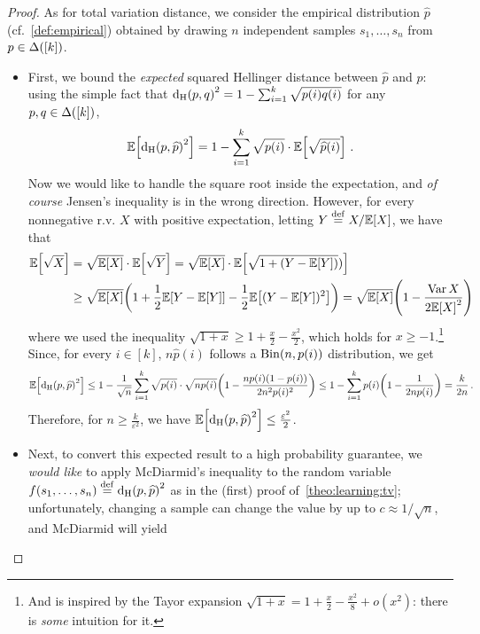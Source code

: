 \documentclass[10pt]{article}
\newcommand{\dst}{\varepsilon}
\newcommand{\ab}{k}
\newcommand{\ns}{n}
\begin{document}
\begin{proof}
    As for total variation distance, we consider the empirical distribution $\widehat{p}$ (cf.~\eqref{def:empirical}) obtained by drawing $\ns$ independent samples $s_1,\dots,s_\ns$ from $p\in\distribs{[\ab]}$.
    
    \begin{itemize}
      \item First, we bound the \emph{expected} squared Hellinger distance between $\widehat{p}$ and $p$: using the simple fact that
      $\hellinger{p}{q}^2 = 1-\sum_{i=1}^\ab \sqrt{p(i)q(i)}$ for any $p,q\in\distribs{[\ab]}$,
      \[
          \expect{ \hellinger{p}{\widehat{p}}^2 } = 1-\sum_{i=1}^\ab \sqrt{p(i)}\cdot \expect{\sqrt{\widehat{p}(i)}}\,.
      \]
      Now we would like to handle the square root inside the expectation, and \emph{of course} Jensen's inequality is in the wrong direction. However, for every nonnegative r.v. $X$ with positive expectation, letting $Y\stackrel{\rm def}{=} X/\mathbb{E}\!\left[X\right]$, we have that
      \begin{align*}
          \expect{\sqrt{X}} 
          &= \sqrt{\expect{X}}\cdot\expect{\sqrt{Y}}
          = \sqrt{\expect{X}}\cdot\expect{\sqrt{1+(Y-\expect{Y})})} \\
          &\geq \sqrt{\expect{X}} \mleft( 1+ \frac{1}{2}\expect{Y-\expect{Y}} - \frac{1}{2} \expect{(Y-\expect{Y})^2} \mright)
          = \sqrt{\expect{X}}\mleft(1-\frac{\var X}{2\expect{X}^2}\mright)
      \end{align*}
      where we used the inequality $\sqrt{1+x} \geq 1+\frac{x}{2}-\frac{x^2}{2}$, which holds for $x\geq -1$.\footnote{And is inspired by the Tayor expansion $\sqrt{1+x} = 1+\frac{x}{2} - \frac{x^2}{8} +o(x^2)$: there is \emph{some} intuition for it.}{} Since, for every $i\in[\ab]$, $\ns\widehat{p}(i)$ follows a $\binomial{\ns}{p(i)}$ distribution, we get
      \[
          \expect{ \hellinger{p}{\widehat{p}}^2 } \leq 1-\frac{1}{\sqrt{\ns}}\sum_{i=1}^\ab \sqrt{p(i)}\cdot\sqrt{\ns p(i)} \mleft(1-\frac{\ns p(i)(1-p(i))}{2\ns^2 p(i)^2}\mright)
          \leq 1 - \sum_{i=1}^\ab p(i) \mleft(1-\frac{1}{2\ns p(i)}\mright) = \frac{\ab}{2\ns}\,.
      \]
      Therefore, for $\ns\geq \frac{\ab}{\dst^2}$, we have $\expect{ \hellinger{p}{\widehat{p}}^2 }\leq \frac{\dst^2}{2}$.
      \item Next, to convert this expected result to a high probability guarantee, we \emph{would like} to apply McDiarmid's inequality to the random variable $f(s_1,\dots,s_\ns) \eqdef \hellinger{p}{\widehat{p}}^2$ as in the (first) proof of~\autoref{theo:learning:tv}; unfortunately, changing a sample can change the value by up to $c \approx 1/\sqrt{\ns}$, and McDiarmid will yield

\end{itemize}
\end{proof}
\end{document}
